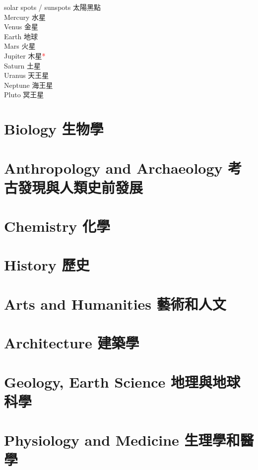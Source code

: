 \documentclass[twoside,b5paper]{book}
\begin{document}
\begin{enumerate}
      solar spots / sunspots 太陽黑點\\
      Mercury 水星\\
      Venus 金星\\
      Earth 地球\\
      Mars 火星\\
      Jupiter 木星\textcolor{red}{*}\\
      Saturn  土星\\
      Uranus  天王星\\
      Neptune  海王星\\
      Pluto  冥王星
  \end{enumerate}


  \chapter{Biology \kai 生物學}

  \chapter{Anthropology and Archaeology \kai 考古發現與人類史前發展}

  \chapter{Chemistry \kai 化學}

  \chapter{History \kai 歷史}

  \chapter{Arts and Humanities \kai 藝術和人文}

  \chapter{Architecture \kai 建築學}

  \chapter{Geology, Earth Science \kai 地理與地球科學}

  \chapter{Physiology and Medicine \kai 生理學和醫學}
\end{document}
